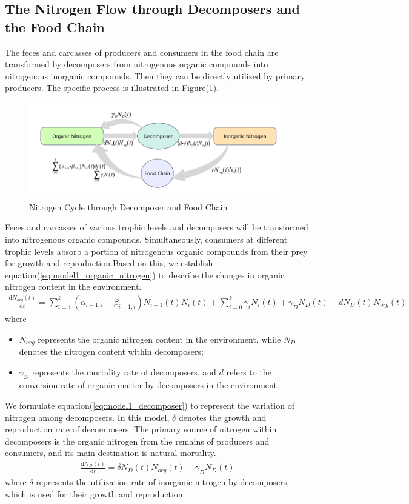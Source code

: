 \documentclass{mcmthesis}
\begin{document}
\subsection{The Nitrogen Flow through Decomposers and the Food Chain}
The feces and carcasses of producers and consumers in the food chain are transformed by decomposers from nitrogenous organic compounds into nitrogenous inorganic compounds. Then they can be directly utilized by primary producers. The specific process is illustrated in Figure(\ref{fig:decomposer_nitrogen}).
\begin{figure}[h] 
\centering
\includegraphics[width=12cm]{figures/decomposer&nitrogen.png}
\caption{Nitrogen Cycle through Decomposer and Food Chain}
\label{fig:decomposer_nitrogen}
\end{figure}

Feces and carcasses of various trophic levels and decomposers  will be transformed into nitrogenous organic compounds. Simultaneously, consumers at different trophic levels absorb a portion of nitrogenous organic compounds from their prey for growth and reproduction.Based on this, we establish equation(\ref{eq:model1_organic_nitrogen}) to describe the changes in organic nitrogen content in the environment.
\begin{align}
    \displaystyle 
    \label{eq:model1_organic_nitrogen}
    \frac{\mathrm{d}N_{org}(t)}{\mathrm{d}t} = \sum_{i=1}^k{\left( \alpha _{i-1,i}-\beta _{i-1,i} \right) N_{i-1}(t)N_i(t)} + \sum_{i=0}^k{\gamma _iN_i(t)} + \gamma _D N_D(t) - d N_D(t) N_{org}(t) 
\end{align}
where
\begin{itemize} 
\item $N_{org}$ represents the organic nitrogen content in the environment, while $N_D$ denotes the nitrogen content within decomposers; 
\item $\gamma_D$ represents the mortality rate of decomposers, and $d$ refers to the conversion rate of organic matter by decomposers in the environment. 
\end{itemize}
We formulate equation(\ref{eq:model1_decomposer}) to represent the variation of nitrogen among decomposers. In this model, $\delta$ denotes the growth and reproduction rate of decomposers. The primary source of nitrogen within decomposers is the organic nitrogen from the remains of producers and consumers, and its main destination is natural mortality.
\begin{align}
      \displaystyle 
    \frac{\mathrm{d}N_D(t)}{\mathrm{d}t} = \delta N_D(t) N_{org}(t) - \gamma _D N_D(t)
    \label{eq:model1_decomposer}
\end{align}
where $\delta$ represents the utilization rate of inorganic nitrogen by decomposers, which is used for their growth and reproduction.
\end{document}
